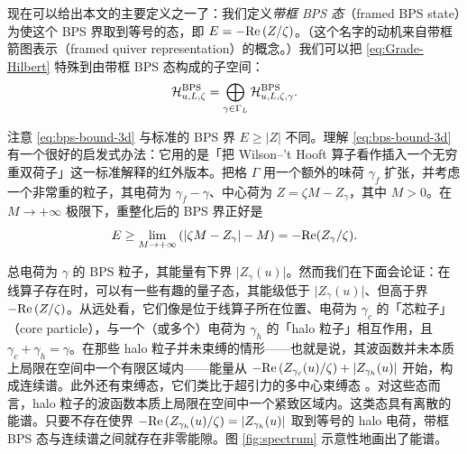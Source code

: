 现在可以给出本文的主要定义之一了：我们定义\emph{带框 BPS 态}（framed BPS state）为使这个 BPS 界取到等号的态，即 $E = -{\rm Re}\, (Z / \zeta)$。（这个名字的动机来自带框箭图表示（framed quiver representation）的概念。）我们可以把 \eqref{eq:Grade-Hilbert} 特殊到由带框 BPS 态构成的子空间：
\begin{equation}\label{eq:Grade-BPS-Hilbert}
\mathcal{H}_{u,L,\zeta}^{\rm BPS} = \bigoplus_{\gamma \in \Gamma_L}
\mathcal{H}_{u,L,\zeta,\gamma}^{\rm BPS}.
\end{equation}

注意 \eqref{eq:bps-bound-3d} 与标准的 BPS 界 $E \geq \vert Z \vert$ 不同。理解 \eqref{eq:bps-bound-3d} 有一个很好的启发式办法：它用的是「把 Wilson–'t Hooft 算子看作插入一个无穷重双荷子」这一标准解释的红外版本。把格 $\Gamma$ 用一个额外的味荷 $\gamma_f$ 扩张，并考虑一个非常重的粒子，其电荷为 $\gamma_f - \gamma$、中心荷为 $Z = \zeta M  -  Z_\gamma$，其中 $M>0$。在 $M \to +\infty$ 极限下，重整化后的 BPS 界正好是
\begin{equation}\label{eq:heuristic-bound}
E \geq  \lim_{M\to +\infty} \left(\vert \zeta M  -  Z_\gamma\vert - M \right)= - {\rm Re}(Z_\gamma/\zeta).
\end{equation}

总电荷为 $\gamma$ 的 BPS 粒子，其能量有下界 $\vert Z_\gamma(u)\vert$。然而我们在下面会论证：在线算子存在时，可以有一些有趣的量子态，其能级低于 $\vert Z_\gamma(u)\vert$、但高于界 $-{\rm Re}\, (Z / \zeta)$。从远处看，它们像是位于线算子所在位置、电荷为 $\gamma_c$ 的「芯粒子」（core particle），与一个（或多个）电荷为 $\gamma_h$ 的「halo 粒子」相互作用，且 $\gamma_c + \gamma_h = \gamma$。在那些 halo 粒子并未束缚的情形——也就是说，其波函数并未本质上局限在空间中一个有限区域内——能量从 $-{\rm Re}\, (Z_{\gamma_c}(u) / \zeta)+ \vert Z_{\gamma_h}(u)\vert$ 开始，构成连续谱。此外还有束缚态，它们类比于超引力的多中心束缚态 \cite{Denef:2000nb,Denef:2000ar}。对这些态而言，halo 粒子的波函数本质上局限在空间中一个紧致区域内。这类态具有离散的能谱。只要不存在使界 $-{\rm Re}\, (Z_{\gamma_h}(u) / \zeta) = \vert Z_{\gamma_h}(u)\vert$ 取到等号的 halo 电荷，带框 BPS 态与连续谱之间就存在非零能隙。图 \ref{fig:spectrum} 示意性地画出了能谱。


